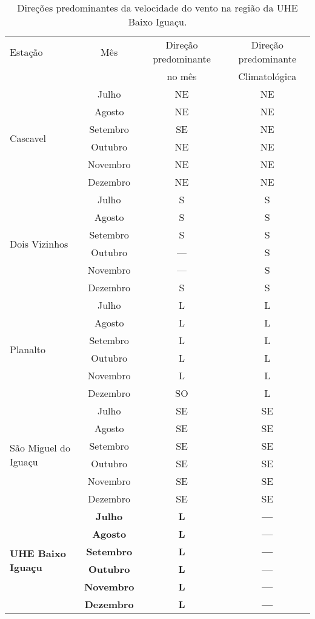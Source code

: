 \documentclass[a4paper,12pt]{article}
\begin{document}
\begin{table}[!hbt]
\begin{center}
\caption{Direções predominantes da velocidade do vento na região da UHE Baixo Iguaçu.}
\label{tab:dire}
\begin{tabular}{lccc}
\hline
Estação & Mês & Direção predominante & Direção predominante \\
        &     &      no mês          &      Climatológica   \\
\hline\multirow{6}{*}{Cascavel} & Julho & NE & NE \\
            & Agosto & NE & NE \\
            & Setembro & SE & NE \\
            & Outubro & NE & NE \\
            & Novembro & NE & NE \\
            & Dezembro & NE & NE \\
\hline\multirow{6}{*}{Dois Vizinhos} & Julho & S & S \\
            & Agosto & S & S \\
            & Setembro & S & S \\
            & Outubro & --- & S \\
            & Novembro & --- & S \\
            & Dezembro & S & S \\
\hline\multirow{6}{*}{Planalto} & Julho & L & L \\
            & Agosto & L & L \\
            & Setembro & L & L \\
            & Outubro & L & L \\
            & Novembro & L & L \\
            & Dezembro & SO & L \\
\hline\multirow{6}{*}{São Miguel do Iguaçu} & Julho & SE & SE \\
            & Agosto & SE & SE \\
            & Setembro & SE & SE \\
            & Outubro & SE & SE \\
            & Novembro & SE & SE \\
            & Dezembro & SE & SE \\
\hline\multirow{6}{*}{\textbf{UHE Baixo Iguaçu}} & \textbf{Julho} & \textbf{L} & \textbf{---} \\
            & \textbf{Agosto} & \textbf{L} & \textbf{{---}} \\
            & \textbf{Setembro} & \textbf{L} & \textbf{{---}} \\
            & \textbf{Outubro} & \textbf{L} & \textbf{{---}} \\
            & \textbf{Novembro} & \textbf{L} & \textbf{{---}} \\
            & \textbf{Dezembro} & \textbf{L} & \textbf{{---}} \\
\hline
\end{tabular}
\end{center}
\end{table}
\end{document}
